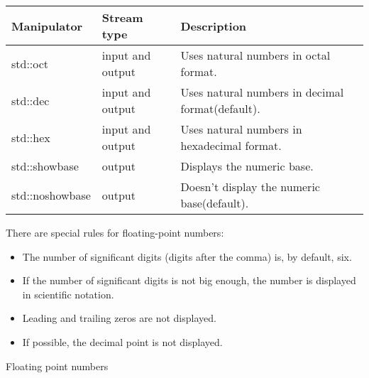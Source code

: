 \begin{longtable}[c]{|l|l|l|}
\hline
\textbf{Manipulator} & \textbf{Stream type} & \textbf{Description}                             \\ \hline
\endfirsthead
%
\endhead
%
std::oct             & input and output     & Uses natural numbers in octal format.            \\ \hline
std::dec             & input and output     & Uses natural numbers in decimal format(default). \\ \hline
std::hex             & input and output     & Uses natural numbers in hexadecimal format.      \\ \hline
std::showbase        & output               & Displays the numeric base.                       \\ \hline
std::noshowbase      & output               & Doesn't display the numeric base(default).       \\ \hline
\end{longtable}

There are special rules for floating-point numbers:

\begin{itemize}
\item 
The number of significant digits (digits after the comma) is, by default, six.

\item 
If the number of significant digits is not big enough, the number is displayed in scientific notation.
 
\item 
Leading and trailing zeros are not displayed.

\item 
If possible, the decimal point is not displayed.
\end{itemize}


\begin{center}
Floating point numbers
\end{center}

